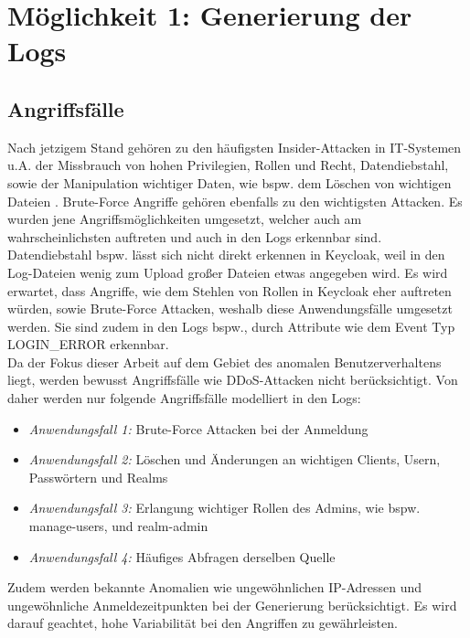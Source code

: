 \documentclass[a4paper,12pt]{article}
\begin{document}
	
	\section{Möglichkeit 1: Generierung der Logs}
	\subsection{Angriffsfälle}
	Nach jetzigem Stand gehören zu den häufigsten Insider-Attacken in IT-Systemen u.A. der Missbrauch von hohen Privilegien, Rollen und Recht, Datendiebstahl, sowie der Manipulation wichtiger Daten, wie bspw. dem Löschen von wichtigen Dateien \cite{singh2022insiderthreats}. Brute-Force Angriffe gehören ebenfalls zu den wichtigsten Attacken. Es wurden jene Angriffsmöglichkeiten umgesetzt, welcher auch am wahrscheinlichsten auftreten und auch in den Logs erkennbar sind. Datendiebstahl bspw. lässt sich nicht direkt erkennen in Keycloak, weil in den Log-Dateien wenig zum Upload großer Dateien etwas angegeben wird. Es wird erwartet, dass Angriffe, wie dem Stehlen von Rollen in Keycloak eher auftreten würden, sowie Brute-Force Attacken, weshalb diese Anwendungsfälle umgesetzt werden. Sie sind zudem in den Logs bspw., durch Attribute wie dem Event Typ LOGIN\_ERROR erkennbar. 
	\\[0.5em]
	Da der Fokus dieser Arbeit auf dem Gebiet des anomalen Benutzerverhaltens liegt, werden bewusst Angriffsfälle wie DDoS-Attacken nicht berücksichtigt. Von daher werden nur folgende Angriffsfälle modelliert in den Logs:
	
	\begin{itemize}
		\item \textit{Anwendungsfall 1: }Brute-Force Attacken bei der Anmeldung
		\item \textit{Anwendungsfall 2: } Löschen und Änderungen an wichtigen Clients, Usern, Passwörtern und Realms
		\item \textit{Anwendungsfall 3: } Erlangung wichtiger Rollen des Admins, wie bspw. manage-users, und realm-admin
		\item \textit{Anwendungsfall 4: } Häufiges Abfragen derselben Quelle
	\end{itemize}
	Zudem werden bekannte Anomalien wie ungewöhnlichen IP-Adressen und ungewöhnliche Anmeldezeitpunkten bei der Generierung berücksichtigt. Es wird darauf geachtet, hohe Variabilität bei den Angriffen zu gewährleisten.
	
\end{document}
